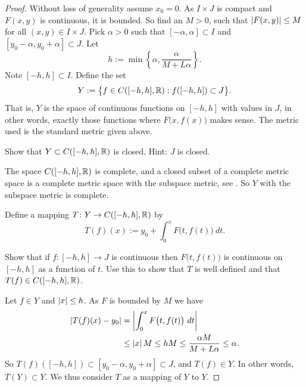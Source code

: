 \begin{proof}
Without loss of generality assume $x_0 =0$.
As $I \times J$ is compact and
$F(x,y)$ is continuous, it is bounded.
So find an $M > 0$, such that
$\left\lvert {F(x,y)} \right\rvert \leq M$ for all $(x,y) \in I\times J$.
Pick $\alpha > 0$ such that
$[-\alpha,\alpha] \subset I$ and $[y_0-\alpha, y_0 + \alpha] \subset J$.
Let
\begin{equation*}
h := \min \left\{ \alpha, \frac{\alpha}{M+L\alpha} \right\} .
\end{equation*}
Note $[-h,h] \subset I$.  Define the set
\begin{equation*}
Y := \bigl\{ f \in C([-h,h],{\mathbb{R}}) : f([-h,h]) \subset J \bigr\} .
\end{equation*}
That is, $Y$ is the space of continuous functions on $[-h,h]$ with values in
$J$, in other words,
exactly those functions where $F\bigl(x,f(x)\bigr)$ makes sense.
The metric used is the standard metric given above.

\begin{exercise}
Show that $Y \subset C([-h,h],{\mathbb{R}})$ is closed.  Hint: $J$ is closed.
\end{exercise}

The space $C([-h,h],{\mathbb{R}})$ is complete, and
a closed subset of a complete metric space is a complete metric space with
the subspace metric, see .  So $Y$ with the subspace metric is
complete.

Define a mapping
$T \colon Y \to C([-h,h],{\mathbb{R}})$ by
\begin{equation*}
T(f)(x)
:=
y_0 + \int_0^x F\bigl(t,f(t)\bigr)~dt .
\end{equation*}

\begin{exercise}
Show that if $f \colon [-h,h] \to J$ is continuous then $F\bigl(t,f(t)\bigr)$
is continuous on $[-h,h]$ as a function of $t$.  Use this to show that
$T$ is well defined and that $T(f) \in C([-h,h],{\mathbb{R}})$.
\end{exercise}

Let $f \in Y$ and $\left\lvert {x} \right\rvert \leq h$.
As $F$ is bounded by $M$ we have
\begin{equation*}
\begin{split}
\left\lvert {T(f)(x) - y_0} \right\rvert
&= \left\lvert {\int_0^x F\bigl(t,f(t)\bigr)~dt} \right\rvert \\
& \leq 
\left\lvert {x} \right\rvert M \leq hM \leq \frac{\alpha M}{M+ L\alpha} \leq \alpha .
\end{split}
\end{equation*}
So $T(f)([-h,h]) \subset [y_0-\alpha,y_0+\alpha] \subset J$, and
$T(f) \in Y$.  In other words, $T(Y) \subset Y$.  We thus consider
$T$ as a mapping of $Y$ to $Y$.


\end{proof}
